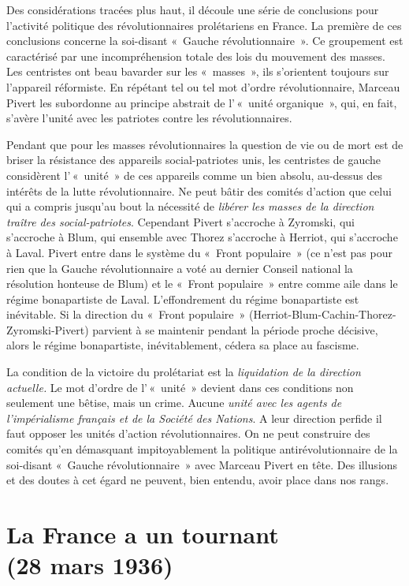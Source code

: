 \documentclass[french,twoside]{book} %
\begin{document}
Des considérations tracées plus haut, il découle une série de conclusions pour l’activité politique des révolutionnaires prolétariens en France. La première de ces conclusions concerne la soi-disant « Gauche révolutionnaire ». Ce groupement est caractérisé par une incompréhension totale des lois du mouvement des masses. Les centristes ont beau bavarder sur les « masses », ils s’orientent toujours sur l’appareil réformiste. En répétant tel ou tel mot d’ordre révolutionnaire, Marceau Pivert les subordonne au principe abstrait de l’ « unité organique », qui, en fait, s’avère l’unité avec les patriotes contre les révolutionnaires.\par
Pendant que pour les masses révolutionnaires la question de vie ou de mort est de briser la résistance des appareils social-patriotes unis, les centristes de gauche considèrent l’ « unité » de ces appareils comme un bien absolu, au-dessus des intérêts de la lutte révolutionnaire. Ne peut bâtir des comités d’action que celui qui a compris jusqu’au bout la nécessité de \emph{libérer les masses de la direction traître des social-patriotes}. Cependant Pivert s’accroche à Zyromski, qui s’accroche à Blum, qui ensemble avec Thorez s’accroche à Herriot, qui s’accroche à Laval. Pivert entre dans le système du « Front populaire » (ce n’est pas pour rien que la Gauche révolutionnaire a voté au dernier Conseil national la résolution honteuse de Blum) et le « Front populaire » entre comme aile dans le régime bonapartiste de Laval. L’effondrement du régime bonapartiste est inévitable. Si la direction du « Front populaire » (Herriot-Blum-Cachin-Thorez-Zyromski-Pivert) parvient à se maintenir pendant la période proche décisive, alors le régime bonapartiste, inévitablement, cédera sa place au fascisme.\par
 La condition de la victoire du prolétariat est la \emph{liquidation de la direction actuelle.} Le mot d’ordre de l’ « unité » devient dans ces conditions non seulement une bêtise, mais un crime. Aucune \emph{unité avec les agents de l’impérialisme français et de la Société des Nations}. A leur direction perfide il faut opposer les unités d’action révolutionnaires. On ne peut construire des comités qu’en démasquant impitoyablement la politique antirévolutionnaire de la soi-disant « Gauche révolutionnaire » avec Marceau Pivert en tête. Des illusions et des doutes à cet égard ne peuvent, bien entendu, avoir place dans nos rangs.
 \section[{La France a un tournant (28 mars 1936)}]{La France a un tournant\protect\footnotemark  \\
(28 mars 1936)}
\label{p5}\renewcommand{\leftmark}{La France a un tournant \\
(28 mars 1936)}
\end{document}
